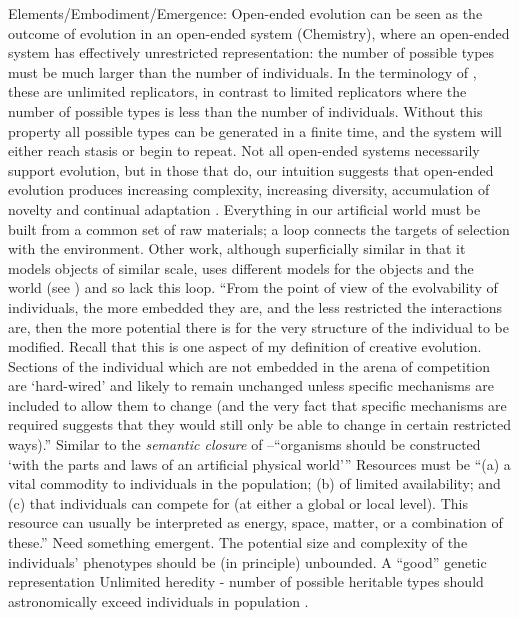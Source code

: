 Elements/Embodiment/Emergence:
Open-ended evolution can be seen as the outcome of evolution in an open-ended system (\eg Chemistry), where an open-ended system has effectively unrestricted representation: the number of possible types must be much larger than the number of individuals. In the terminology of \cite{Szathmary:2006ty}, these are unlimited replicators, in contrast to limited replicators where the number of possible types is less than the number of individuals. Without this property all possible types can be generated in a finite time, and the system will either reach stasis or begin to repeat. Not all open-ended systems necessarily support evolution, but in those that do, our intuition suggests that open-ended evolution produces increasing complexity, increasing diversity, accumulation of novelty and continual adaptation \parencite{Lehman2012}.
Everything in our artificial world must be built from a common set of raw materials; a loop connects the targets of selection with the environment. Other work, although superficially similar in that it models objects of similar scale, uses different models for the objects and the world (see \parencite{Sanchez-Dehesa:2008uq}) and so lack this loop.
``From the point of view of the evolvability of individuals, the more embedded they are, and the less restricted the interactions are, then the more potential there is for the very structure of the individual to be modified. Recall that this is one aspect of my definition of creative evolution. Sections of the individual which are not embedded in the arena of competition are `hard-wired' and
likely to remain unchanged unless specific mechanisms are included to allow them to change (and the very fact that specific mechanisms are required suggests that they would still only be able to change in certain restricted ways).'' \cite{Taylor2001}
Similar to the \emph{semantic closure} of \cite{Pattee1995a}--``organisms should be constructed `with the parts and laws of an artificial physical world''' \cite{Taylor2001}
Resources must be ``(a) a vital commodity to individuals in the population; (b) of limited availability; and (c) that individuals can compete for (at either a global or local level). This resource can usually be interpreted as energy, space, matter, or a combination of these.'' \parencite{Taylor2001}
Need something emergent. \parencite{Nellis2014}
The potential size and complexity of the individuals' phenotypes should be (in principle) unbounded.  \parencite{Soros2014}
A ``good'' genetic representation \parencite{Soros2014}
Unlimited heredity - number of possible heritable types should astronomically exceed individuals in population \parencite{Vasas2015}.
